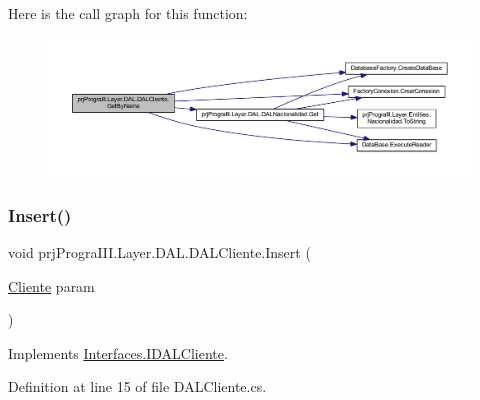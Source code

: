 Here is the call graph for this function\+:
\nopagebreak
\begin{figure}[H]
\begin{center}
\leavevmode
\includegraphics[width=350pt]{classprj_progra_i_i_i_1_1_layer_1_1_d_a_l_1_1_d_a_l_cliente_ad65a26a4c49f914716a21169e79815c8_cgraph}
\end{center}
\end{figure}
\hypertarget{classprj_progra_i_i_i_1_1_layer_1_1_d_a_l_1_1_d_a_l_cliente_ab9646dc3260db65cb7baf86ed33e3d70}{}\label{classprj_progra_i_i_i_1_1_layer_1_1_d_a_l_1_1_d_a_l_cliente_ab9646dc3260db65cb7baf86ed33e3d70} 
\subsubsection{\texorpdfstring{Insert()}{Insert()}}
{\footnotesize\ttfamily void prj\+Progra\+I\+I\+I.\+Layer.\+D\+A\+L.\+D\+A\+L\+Cliente.\+Insert (\begin{DoxyParamCaption}\item[{\hyperlink{classprj_progra_i_i_i_1_1_layer_1_1_entities_1_1_cliente}{Cliente}}]{param }\end{DoxyParamCaption})}



Implements \hyperlink{interface_interfaces_1_1_i_d_a_l_cliente_a40bcf21f1dc9f878612b974300076d6c}{Interfaces.\+I\+D\+A\+L\+Cliente}.



Definition at line 15 of file D\+A\+L\+Cliente.\+cs.

